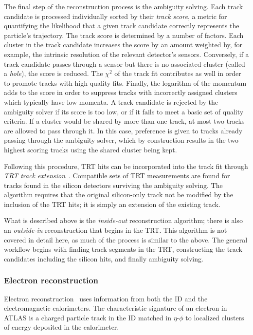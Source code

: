 The final step of the reconstruction process is the ambiguity solving.
Each track candidate is processed individually sorted by their \emph{track score}, a metric for quantifying the likelihood that a given track candidate correctly represents the particle's trajectory.
The track score is determined by a number of factors.
Each cluster in the track candidate increases the score by an amount weighted by, for example, the intrinsic resolution of the relevant detector's sensors.
Conversely, if a track candidate passes through a sensor but there is no associated cluster (called a \emph{hole}), the score is reduced.
The $\chi^2$ of the track fit contributes as well in order to promote tracks with high quality fits.
Finally, the logarithm of the momentum adds to the score in order to suppress tracks with incorrectly assigned clusters which typically have low momenta.
A track candidate is rejected by the ambiguity solver if its score is too low, or if it fails to meet a basic set of quality criteria.
If a cluster would be shared by more than one track, at most two tracks are allowed to pass through it.
In this case, preference is given to tracks already passing through the ambiguity solver, which by construction results in the two highest scoring tracks using the shared cluster being kept.

Following this procedure, TRT hits can be incorporated into the track fit through \emph{TRT track extension}~\cite{2008.newt}.
Compatible sets of TRT measurements are found for tracks found in the silicon detectors surviving the ambiguity solving.
The algorithm requires that the original silicon-only track not be modified by the inclusion of the TRT hits; it is simply an extension of the existing track.

What is described above is the \emph{inside-out} reconstruction algorithm; there is also an \emph{outside-in} reconstruction that begins in the TRT.
This algorithm is not covered in detail here, as much of the process is similar to the above.
The general workflow begins with finding track segments in the TRT, constructing the track candidates including the silicon hits, and finally ambiguity solving.

\subsubsection{Electron reconstruction}\label{detector:electron_reconstruction}
Electron reconstruction~\cite{2019.electron-reco-id} uses information from both the ID and the electromagnetic calorimeters.
The characteristic signature of an electron in ATLAS is a charged particle track in the ID matched in $\eta$-$\phi$ to localized clusters of energy deposited in the calorimeter.

